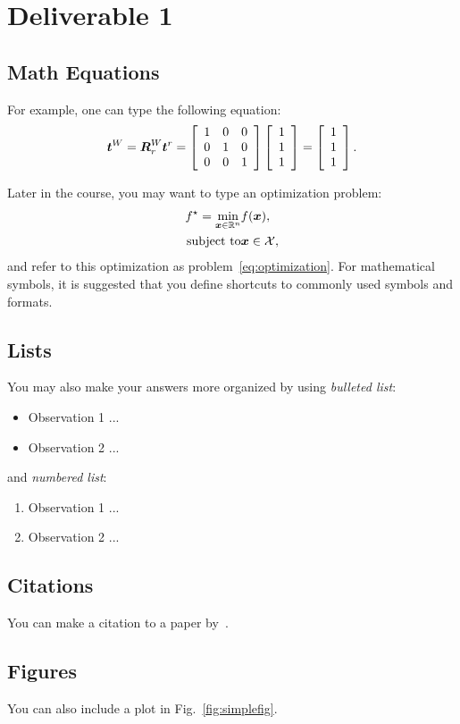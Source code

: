 \section{Deliverable 1}
\label{sec:deliverable-1}

\subsection{Math Equations}
For example, one can type the following equation:
\begin{equation}
\boldsymbol{t}^W = \boldsymbol{R}_r^W \boldsymbol{t}^r = \left[\begin{array}{ccc}
1 & 0 & 0 \\
0 & 1 & 0 \\
0 & 0 & 1
\end{array} \right]
\left[\begin{array}{c}
1\\
1 \\
1
\end{array} \right]
= 
\left[\begin{array}{c}
1\\
1 \\
1
\end{array} \right].
\end{equation}

Later in the course, you may want to type an optimization problem:
\begin{eqnarray}
f^\star = \min_{\boldsymbol{x} \in \mathbb{R}^n} & f(\boldsymbol{x}), \label{eq:optimization}\\
\text{subject to}  & \boldsymbol{x} \in \mathcal{X},
\end{eqnarray}
and refer to this optimization as problem~\eqref{eq:optimization}. For mathematical symbols, it is suggested that you define shortcuts to commonly used symbols and formats.

\subsection{Lists}
You may also make your answers more organized by using \emph{bulleted list}:
\begin{itemize}
	\item Observation 1 ...
	\item Observation 2 ...
\end{itemize}
and \emph{numbered list}:
\begin{enumerate}
	\item Observation 1 ...
	\item Observation 2 ...
\end{enumerate}

\subsection{Citations}
You can make a citation to a paper by~\cite{horn87josa-registration}.

\subsection{Figures}
You can also include a plot in Fig.~\ref{fig:simplefig}.

